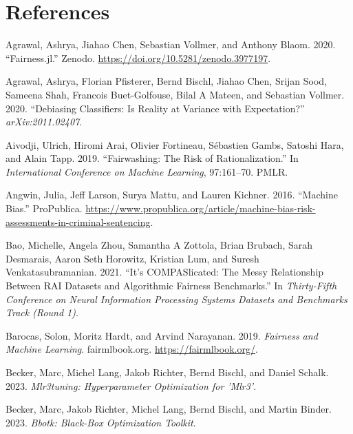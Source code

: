 \hypertarget{references}{%
\section*{References}\label{references}}

\hypertarget{refs}{}
\begin{CSLReferences}{1}{0}
\leavevmode{}%
Agrawal, Ashrya, Jiahao Chen, Sebastian Vollmer, and Anthony Blaom. 2020. {``Fairness.jl.''} Zenodo. \url{https://doi.org/10.5281/zenodo.3977197}.

\leavevmode{}%
Agrawal, Ashrya, Florian Pfisterer, Bernd Bischl, Jiahao Chen, Srijan Sood, Sameena Shah, Francois Buet-Golfouse, Bilal A Mateen, and Sebastian Vollmer. 2020. {``Debiasing Classifiers: Is Reality at Variance with Expectation?''} \emph{arXiv:2011.02407}.

\leavevmode{}%
Aivodji, Ulrich, Hiromi Arai, Olivier Fortineau, Sébastien Gambs, Satoshi Hara, and Alain Tapp. 2019. {``Fairwashing: The Risk of Rationalization.''} In \emph{International Conference on Machine Learning}, 97:161--70. PMLR.

\leavevmode{}%
Angwin, Julia, Jeff Larson, Surya Mattu, and Lauren Kichner. 2016. {``Machine Bias.''} ProPublica. \url{https://www.propublica.org/article/machine-bias-risk-assessments-in-criminal-sentencing}.

\leavevmode{}%
Bao, Michelle, Angela Zhou, Samantha A Zottola, Brian Brubach, Sarah Desmarais, Aaron Seth Horowitz, Kristian Lum, and Suresh Venkatasubramanian. 2021. {``It's COMPASlicated: The Messy Relationship Between RAI Datasets and Algorithmic Fairness Benchmarks.''} In \emph{Thirty-Fifth Conference on Neural Information Processing Systems Datasets and Benchmarks Track (Round 1)}.

\leavevmode{}%
Barocas, Solon, Moritz Hardt, and Arvind Narayanan. 2019. \emph{Fairness and Machine Learning}. fairmlbook.org. \url{https://fairmlbook.org/}.

\leavevmode{}%
Becker, Marc, Michel Lang, Jakob Richter, Bernd Bischl, and Daniel Schalk. 2023. \emph{Mlr3tuning: Hyperparameter Optimization for 'Mlr3'}.

\leavevmode{}%
Becker, Marc, Jakob Richter, Michel Lang, Bernd Bischl, and Martin Binder. 2023. \emph{Bbotk: Black-Box Optimization Toolkit}.


\end{CSLReferences}

